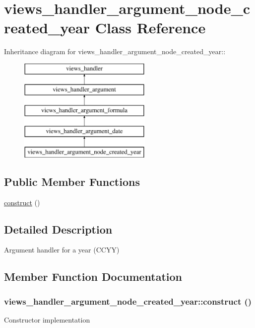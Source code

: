 \hypertarget{classviews__handler__argument__node__created__year}{
\section{views\_\-handler\_\-argument\_\-node\_\-created\_\-year Class Reference}
\label{classviews__handler__argument__node__created__year}
}
Inheritance diagram for views\_\-handler\_\-argument\_\-node\_\-created\_\-year::\begin{figure}[H]
\begin{center}
\leavevmode
\includegraphics[height=5cm]{classviews__handler__argument__node__created__year}
\end{center}
\end{figure}
\subsection*{Public Member Functions}
\begin{DoxyCompactItemize}
\item 
\hyperlink{classviews__handler__argument__node__created__year_aa40b34ab0d297264f7378fc995e06bc7}{construct} ()
\end{DoxyCompactItemize}


\subsection{Detailed Description}
Argument handler for a year (CCYY) 

\subsection{Member Function Documentation}
\hypertarget{classviews__handler__argument__node__created__year_aa40b34ab0d297264f7378fc995e06bc7}{
\subsubsection[{construct}]{\setlength{\rightskip}{0pt plus 5cm}views\_\-handler\_\-argument\_\-node\_\-created\_\-year::construct ()}}
\label{classviews__handler__argument__node__created__year_aa40b34ab0d297264f7378fc995e06bc7}
Constructor implementation 

